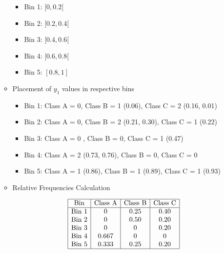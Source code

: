 \documentclass[12pt]{article}
\begin{document}
\begin{enumerate}[leftmargin=\labelsep, label=\textbf{\arabic*.)}]
\begin{itemize}
                    \begin{itemize}
                        \item Bin 1: $[0, 0.2[$
                        \item Bin 2: $[0.2, 0.4[$
                        \item Bin 3: $[0.4, 0.6[$
                        \item Bin 4: $[0.6, 0.8[$
                        \item Bin 5: $[0.8, 1]$
                    \end{itemize}

              \item Placement of $y_1$ values in respective bins

                    \begin{itemize}
                        \item Bin 1: Class A = 0, Class B = 1 (0.06), Class C = 2 (0.16, 0.01)
                        \item Bin 2: Class A = 0, Class B = 2 (0.21, 0.30), Class C = 1 (0.22)
                        \item Bin 3: Class A = 0 , Class B = 0, Class C = 1 (0.47)
                        \item Bin 4: Class A = 2 (0.73, 0.76), Class B = 0, Class C = 0
                        \item Bin 5: Class A = 1 (0.86), Class B = 1 (0.89), Class C = 1 (0.93)
                    \end{itemize}

              \item Relative Frequencies Calculation

                    \[
                        \begin{array}{|c|c|c|c|}
                            \hline
                            \text{Bin}   & \text{Class A} & \text{Class B} & \text{Class C} \\
                            \hline
                            \text{Bin 1} & 0              & 0.25           & 0.40           \\
                            \text{Bin 2} & 0              & 0.50           & 0.20           \\
                            \text{Bin 3} & 0              & 0              & 0.20           \\
                            \text{Bin 4} & 0.667          & 0              & 0              \\
                            \text{Bin 5} & 0.333          & 0.25           & 0.20           \\
                            \hline
                        \end{array}
                    \]


\end{itemize}
\end{enumerate}
\end{document}
